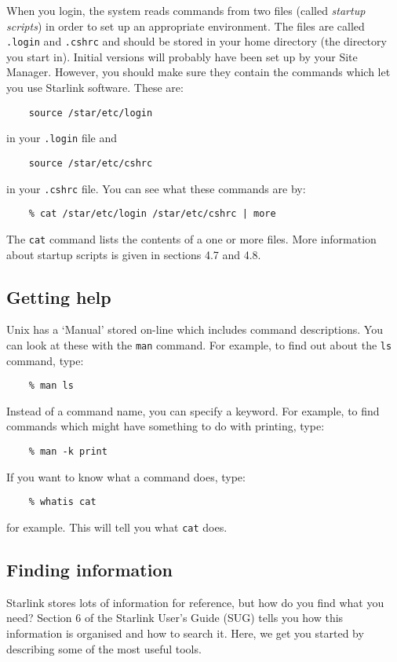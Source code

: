 \documentclass[twoside,11pt]{article}
\newcommand{\htmlref}[2]{#1}
\newcommand{\xref}[3]{#1}
\begin{document}
When you login, the system reads commands from two files (called {\em startup
scripts}) in order to set up an appropriate environment.
The files are called {\tt .login} and {\tt .cshrc} and should be stored in your
home directory (the directory you start in).
Initial versions will probably have been set up by your Site Manager.
However, you should make sure they contain the commands which let you use
Starlink software.
These are:
\begin{verbatim}
    source /star/etc/login
\end{verbatim}
in your {\tt .login} file and
\begin{verbatim}
    source /star/etc/cshrc
\end{verbatim}
in your {\tt .cshrc} file.
You can see what these commands are by:
\begin{verbatim}
    % cat /star/etc/login /star/etc/cshrc | more
\end{verbatim}
The {\tt cat} command lists the contents of a one or more files.
More information about startup scripts is given in sections
\htmlref{4.7}{ss1} and
\htmlref{4.8}{ss2}.

\subsection{Getting help}

Unix has a `Manual' stored on-line which includes command descriptions.
You can look at these with the {\tt man} command.
For example, to find out about the {\tt ls} command, type:
\begin{verbatim}
    % man ls
\end{verbatim}
Instead of a command name, you can specify a keyword.
For example, to find commands which might have something to do with printing,
type:
\begin{verbatim}
    % man -k print
\end{verbatim}
If you want to know what a command does, type:
\begin{verbatim}
    % whatis cat
\end{verbatim}
for example.
This will tell you what {\tt cat} does.

\subsection{Finding information}

Starlink stores lots of information for reference, but how do you find
what you need?
Section 6 of the Starlink User's Guide
(\xref{SUG}{sug}{}) tells you how this
information is organised and how to search it.
Here, we get you started by describing some of the most useful tools.
\end{document}
